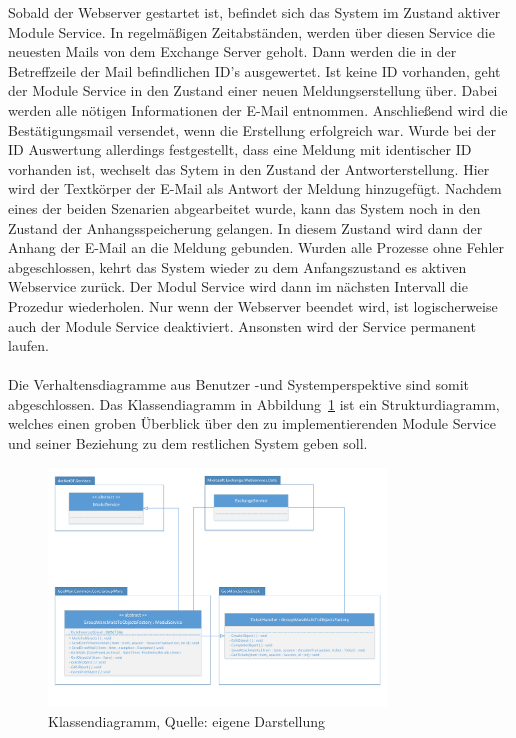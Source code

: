\noindent
Sobald der Webserver gestartet ist, befindet sich das System im Zustand aktiver Module Service. In regelmäßigen Zeitabständen, werden über diesen Service die neuesten Mails von dem Exchange Server geholt. Dann werden die in der Betreffzeile der Mail befindlichen ID's ausgewertet. Ist keine ID vorhanden, geht der Module Service in den Zustand einer neuen Meldungserstellung über. Dabei werden alle nötigen Informationen der E-Mail entnommen. Anschließend wird die Bestätigungsmail versendet, wenn die Erstellung erfolgreich war.\newline
Wurde bei der ID Auswertung allerdings festgestellt, dass eine Meldung mit identischer ID vorhanden ist, wechselt das Sytem in den Zustand der Antworterstellung. Hier wird der Textkörper der E-Mail als Antwort der Meldung hinzugefügt.\newline
Nachdem eines der beiden Szenarien abgearbeitet wurde, kann das System noch in den Zustand der Anhangsspeicherung gelangen. In diesem Zustand wird dann der Anhang der E-Mail an die Meldung gebunden. Wurden alle Prozesse ohne Fehler abgeschlossen, kehrt das System wieder zu dem Anfangszustand es aktiven Webservice zurück. Der Modul Service wird dann im nächsten Intervall die Prozedur wiederholen. Nur wenn der Webserver beendet wird, ist logischerweise auch der Module Service deaktiviert. Ansonsten wird der Service permanent laufen.\\\\

\noindent
Die Verhaltensdiagramme aus Benutzer -und Systemperspektive sind somit abgeschlossen. Das Klassendiagramm in Abbildung~\ref{fig:Klassendiagramm} ist ein Strukturdiagramm, welches einen groben Überblick über den zu implementierenden Module Service und seiner Beziehung zu dem restlichen System geben soll. \newpage 

\begin{figure}[h!]
\centering
\includegraphics[width=0.80\textwidth]{Abbildungen/Klassendiagramm.pdf}
	\caption[Klassendiagramm]{Klassendiagramm, Quelle: eigene Darstellung}
	\label{fig:Klassendiagramm}
\end{figure}


